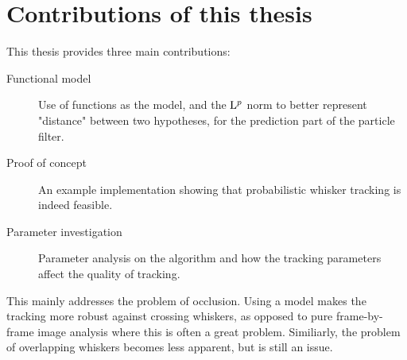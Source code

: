 \section{Contributions of this thesis}
This thesis provides three main contributions:
\begin{description}
\item[Functional model] Use of functions as the model, and the $\mathrm{L}^{p}$
  norm to better represent "distance" between two hypotheses, for the
  prediction part of the particle filter.
\item[Proof of concept] An example implementation showing that
  probabilistic whisker tracking is indeed feasible.
\item[Parameter investigation] Parameter analysis on the algorithm and
  how the tracking parameters affect the quality of tracking.
\end{description}

This mainly addresses the problem of occlusion. Using a model makes
the tracking more robust against crossing whiskers, as opposed to pure
frame-by-frame image analysis where this is often a great
problem. Similiarly, the problem of overlapping whiskers becomes less
apparent, but is still an issue.
